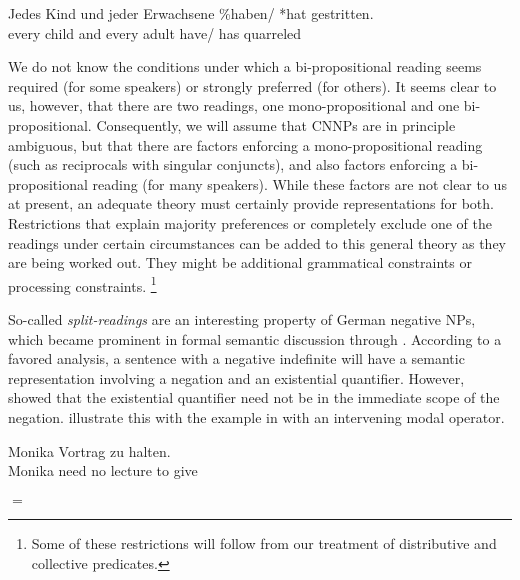 \documentclass[output=paper]{langsci/langscibook}
\begin{document}
\ea \label{ex-eltern-jed}
\gll Jedes Kind und jeder Erwachsene \%haben/ *hat gestritten.\\
every child and every adult \hphantom{\%}have/ \hphantom{*}has quarreled\\
\z 

We do not know the conditions under which a bi-pro\-po\-si\-tional reading seems required (for some speakers) or strongly preferred (for others). 
It seems clear to us, however, that there are two readings, one mono-propositional and one bi-pro\-po\-si\-tional. 
Consequently, we will assume that CNNPs are in principle ambiguous, but that there are factors enforcing a mono-propositional reading (such as reciprocals with singular conjuncts), and also factors enforcing a bi-propositional reading (for many speakers). 
While these factors are not clear to us at present, an adequate theory must certainly provide representations for both. 
Restrictions that explain majority preferences or completely exclude one of the readings under certain circumstances can be added to this general theory as they are being worked out. They might be additional grammatical constraints or processing constraints.%
\footnote{Some of these restrictions will follow from our treatment of distributive and collective predicates.}





\bigskip%
So-called \emph{split-readings} are an interesting property of German negative NPs, which became prominent in formal semantic discussion through \citet{Jacobs:80}. 
According to a favored analysis, a sentence with a negative indefinite will have a semantic representation involving a negation and an existential quantifier. 
However, \citet{Jacobs:80} showed that the existential quantifier need not be in the immediate scope of the negation. \citet{Penka:Stechow:01} illustrate this with the example in  with an intervening modal operator.

\ea \label{ex-tie}
\gll Monika   Vortrag zu halten.\\
Monika need no lecture to give\\
\glt {}\\
$=$ 
\z 
\end{document}
